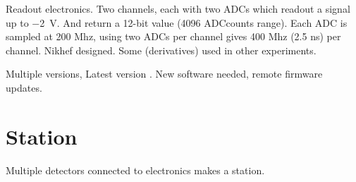 Readout electronics. Two channels, each with two ADCs which readout a
signal up to \SI{-2}{\volt}. And return a 12-bit value (4096 ADCcounts
range). Each ADC is sampled at 200 Mhz, using two ADCs per channel gives
400 Mhz (2.5 ns) per channel. Nikhef designed. Some (derivatives) used
in other experiments.

Multiple versions, Latest version \hisparciii. New software needed,
remote firmware updates.


\section{Station}

Multiple detectors connected to \hisparc electronics makes a station.

\begin{figure}
    \centering
    
    \caption{}
    \label{fig:4_detector_station}
\end{figure}

